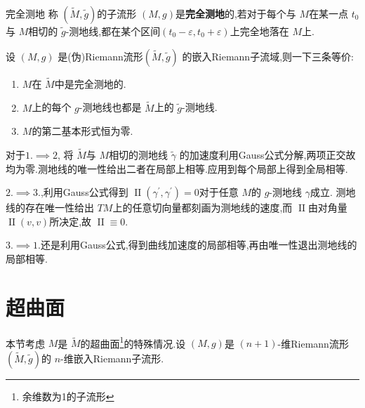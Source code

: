 \documentclass[../../几何与拓扑.tex]{subfiles}
\begin{document}
\begin{definition}{完全测地}
    称 \(  \left( \tilde{M},\tilde{g} \right)   \)的子流形 \(  \left( M,g \right)   \)是\textbf{完全测地}的,若对于每个与 \(  M  \)在某一点 \(  t_0   \)与 \(  M  \)相切的 \(  \tilde{g}  \)-测地线,都在某个区间\(  \left( t_0- \varepsilon ,t_0+  \varepsilon  \right)   \)上完全地落在 \(  M  \)上.        
\end{definition}

\begin{proposition}
    设 \(  \left( M,g \right)   \) 是(伪)Riemann流形\(  \left( \tilde{M},\tilde{g} \right)   \) 的嵌入Riemann子流域,则一下三条等价:
    \begin{enumerate}
        \item \(  M  \)在 \(  \tilde{M}  \)中是完全测地的.
        \item \(  M  \)上的每个 \(  g  \)-测地线也都是 \(  \tilde{M}  \)上的 \(  \tilde{g}  \)-测地线.
        \item \(  M  \)的第二基本形式恒为零.       
    \end{enumerate}
    
\end{proposition}

\begin{note}
    对于\(  1.\implies 2  \), 将 \(  \tilde{M}  \)与 \(  M  \)相切的测地线 \(   \tilde{\gamma}   \) 的加速度利用Gauss公式分解,两项正交故均为零.测地线的唯一性给出二者在局部上相等.应用到每个局部上得到全局相等.
    
    \(  2.\implies 3.  \),利用Gauss公式得到 \(  \operatorname{II}\left(  \gamma ^{\prime} , \gamma ^{\prime}  \right)= 0   \)对于任意 \(  M  \)的 \(  g  \)-测地线 \(   \gamma   \)成立. 测地线的存在唯一性给出 \(  TM  \)上的任意切向量都刻画为测地线的速度,而 \(  \operatorname{II}  \)由对角量\(  \operatorname{II}\left( v,v \right)   \)所决定,故 \(  \operatorname{II}\equiv 0  \).
    
    \(  3.\implies   1.\)还是利用Gauss公式,得到曲线加速度的局部相等,再由唯一性退出测地线的局部相等. 
\end{note}

\section{超曲面}

本节考虑 \(  M  \)是 \(  \tilde{M}  \)的超曲面\footnote{余维数为1的子流形}的特殊情况.设 \(  \left( M,g \right)   \)是 \(  \left( n+ 1 \right)   \)-维Riemann流形 \(  \left( \tilde{M},\tilde{g} \right)   \)的 \(  n  \)-维嵌入Riemann子流形.
\end{document}
